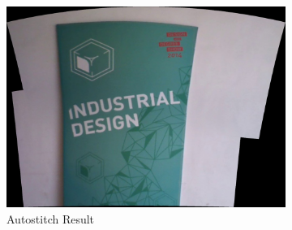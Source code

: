 \begin{figure}
\begin{subfigure}[b]{0.45\textwidth}
\includegraphics[width=\linewidth]{figures/idc_indoor/autostitch.jpg}
\caption{Autostitch Result}
\end{subfigure}
\begin{subfigure}[b]{0.45\textwidth}

\end{subfigure}
\end{figure}
